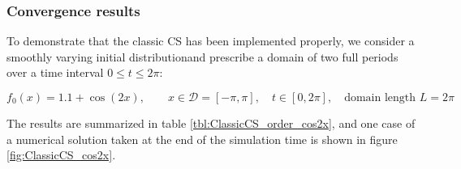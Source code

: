 \documentclass[11pt,titlepage]{report}
\begin{document}
\subsubsection{Convergence results}

\indent\indent To demonstrate that the classic CS has been implemented properly, we consider a smoothly varying initial distributionand prescribe a domain of two full periods over a time interval $0 \leq t \leq 2\pi$:

\begin{equation}f_0(x) = 1.1 + \cos(2x), \qquad x\in\mathcal{D} = [-\pi, \pi], \quad t\in [0,2\pi], \quad \text{domain length } L = 2\pi \label{eq:cosine_2x}\end{equation}

\noindent The results are summarized in table \ref{tbl:ClassicCS_order_cos2x}, and one case of a numerical solution taken at the end of the simulation time is shown in figure \ref{fig:ClassicCS_cos2x}.
\end{document}
